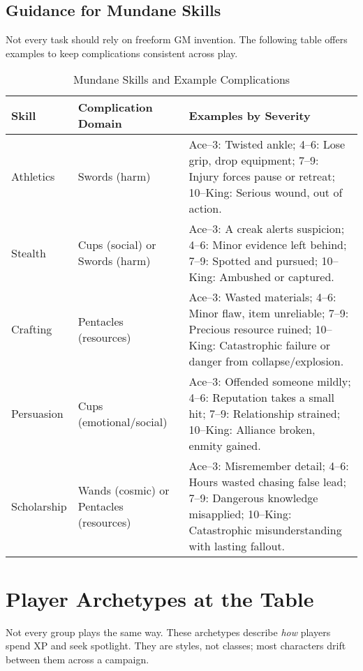 \documentclass[12pt]{book}
\begin{document}
\section{Guidance for Mundane Skills}
Not every task should rely on freeform GM invention. The following table offers examples to keep complications consistent across play.

\begin{table}[h]
\centering
\begin{tabular}{|p{2cm}|p{3cm}|p{7cm}|}
\hline
\textbf{Skill} & \textbf{Complication Domain} & \textbf{Examples by Severity} \\
\hline
Athletics & Swords (harm) &  
Ace–3: Twisted ankle;  
4–6: Lose grip, drop equipment;  
7–9: Injury forces pause or retreat;  
10–King: Serious wound, out of action. \\
\hline
Stealth & Cups (social) or Swords (harm) &  
Ace–3: A creak alerts suspicion;  
4–6: Minor evidence left behind;  
7–9: Spotted and pursued;  
10–King: Ambushed or captured. \\
\hline
Crafting & Pentacles (resources) &  
Ace–3: Wasted materials;  
4–6: Minor flaw, item unreliable;  
7–9: Precious resource ruined;  
10–King: Catastrophic failure or danger from collapse/explosion. \\
\hline
Persuasion & Cups (emotional/social) &  
Ace–3: Offended someone mildly;  
4–6: Reputation takes a small hit;  
7–9: Relationship strained;  
10–King: Alliance broken, enmity gained. \\
\hline
Scholarship & Wands (cosmic) or Pentacles (resources) &  
Ace–3: Misremember detail;  
4–6: Hours wasted chasing false lead;  
7–9: Dangerous knowledge misapplied;  
10–King: Catastrophic misunderstanding with lasting fallout. \\
\hline
\end{tabular}
\caption{Mundane Skills and Example Complications}
\end{table}

\chapter{Player Archetypes at the Table}

Not every group plays the same way. These archetypes describe \emph{how} players spend XP and seek spotlight. They are styles, not classes; most characters drift between them across a campaign.
\end{document}
